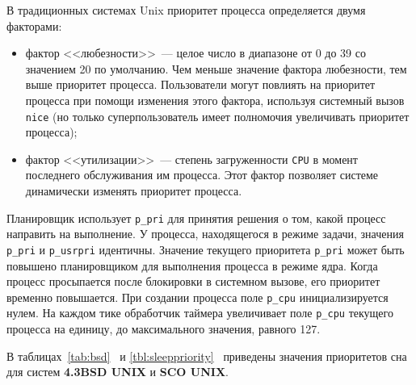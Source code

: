 В традиционных системах Unix приоритет процесса определяется двумя факторами: 

\begin{itemize}
	\item фактор <<любезности>>~--- целое число в диапазоне от 0 до 39 со значением 20 по умолчанию. 
	Чем меньше значение фактора любезности, тем выше приоритет процесса. 
	Пользователи могут повлиять на приоритет процесса при помощи изменения этого фактора, используя системный вызов \texttt{nice} (но только суперпользователь имеет полномочия увеличивать приоритет процесса);
	
	\item фактор <<утилизации>>~--- степень загруженности \texttt{CPU} в момент последнего обслуживания им процесса. 
	Этот фактор позволяет системе динамически изменять приоритет процесса.
\end{itemize}

Планировщик использует \texttt{p\_pri} для принятия решения о том, какой процесс направить на выполнение. 
У процесса, находящегося в режиме задачи, значения \texttt{p\_pri} и \texttt{p\_usrpri} идентичны.
Значение текущего приоритета \texttt{p\_pri} может быть повышено планировщиком для выполнения процесса в режиме ядра. 
Когда процесс просыпается после блокировки в системном вызове, его приоритет временно повышается. 
При создании процесса поле \texttt{p\_cpu} инициализируется нулем. 
На каждом тике обработчик таймера увеличивает поле \texttt{p\_cpu} текущего процесса на единицу, до максимального значения, равного 127.

В таблицах~\ref{tab:bsd}~\cite{unix} и \ref{tbl:sleeppriority}~\cite{unixos} приведены значения приоритетов сна для систем \textbf{4.3BSD UNIX} и \textbf{SCO UNIX}.

